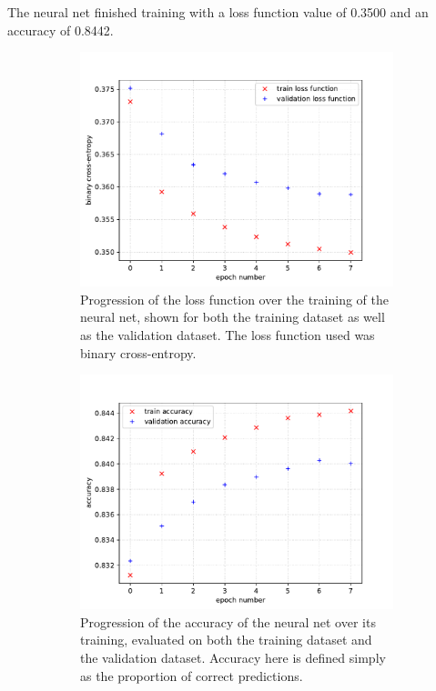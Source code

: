 \documentclass[11pt]{article}
\numberwithin{equation}{section}
\numberwithin{figure}{section}
\numberwithin{table}{section}
\begin{document}
The neural net finished training with a loss function value of \num{0.3500} and an accuracy of \num{0.8442}.

\begin{figure}[h]%
    \centering
    \begin{subfigure}{.49\linewidth}
        \centering
        \includegraphics[width=\linewidth]{Plots/loss_history.pdf}
        \caption{Progression of the loss function over the training of the neural net, shown for both the training dataset as well as the validation dataset. The loss function used was binary cross-entropy.}
        \label{fig:loss_history}
    \end{subfigure}
    \hfill
    \begin{subfigure}{.49\linewidth}
        \centering
        \includegraphics[width=\linewidth]{Plots/accuracy_history.pdf}
        \caption{Progression of the accuracy of the neural net over its training, evaluated on both the training dataset and the validation dataset. Accuracy here is defined simply as the proportion of correct predictions.}
        \label{fig:accuracy_history}
    \end{subfigure}
    \caption{}
    \label{fig:loss_accuracy}
\end{figure}
\end{document}
